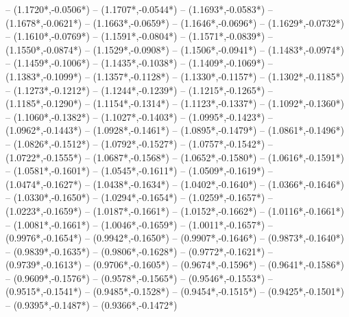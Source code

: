 {	-- ({1.1720*\dx},{-0.0506*\dy})
	-- ({1.1707*\dx},{-0.0544*\dy})
	-- ({1.1693*\dx},{-0.0583*\dy})
	-- ({1.1678*\dx},{-0.0621*\dy})
	-- ({1.1663*\dx},{-0.0659*\dy})
	-- ({1.1646*\dx},{-0.0696*\dy})
	-- ({1.1629*\dx},{-0.0732*\dy})
	-- ({1.1610*\dx},{-0.0769*\dy})
	-- ({1.1591*\dx},{-0.0804*\dy})
	-- ({1.1571*\dx},{-0.0839*\dy})
	-- ({1.1550*\dx},{-0.0874*\dy})
	-- ({1.1529*\dx},{-0.0908*\dy})
	-- ({1.1506*\dx},{-0.0941*\dy})
	-- ({1.1483*\dx},{-0.0974*\dy})
	-- ({1.1459*\dx},{-0.1006*\dy})
	-- ({1.1435*\dx},{-0.1038*\dy})
	-- ({1.1409*\dx},{-0.1069*\dy})
	-- ({1.1383*\dx},{-0.1099*\dy})
	-- ({1.1357*\dx},{-0.1128*\dy})
	-- ({1.1330*\dx},{-0.1157*\dy})
	-- ({1.1302*\dx},{-0.1185*\dy})
	-- ({1.1273*\dx},{-0.1212*\dy})
	-- ({1.1244*\dx},{-0.1239*\dy})
	-- ({1.1215*\dx},{-0.1265*\dy})
	-- ({1.1185*\dx},{-0.1290*\dy})
	-- ({1.1154*\dx},{-0.1314*\dy})
	-- ({1.1123*\dx},{-0.1337*\dy})
	-- ({1.1092*\dx},{-0.1360*\dy})
	-- ({1.1060*\dx},{-0.1382*\dy})
	-- ({1.1027*\dx},{-0.1403*\dy})
	-- ({1.0995*\dx},{-0.1423*\dy})
	-- ({1.0962*\dx},{-0.1443*\dy})
	-- ({1.0928*\dx},{-0.1461*\dy})
	-- ({1.0895*\dx},{-0.1479*\dy})
	-- ({1.0861*\dx},{-0.1496*\dy})
	-- ({1.0826*\dx},{-0.1512*\dy})
	-- ({1.0792*\dx},{-0.1527*\dy})
	-- ({1.0757*\dx},{-0.1542*\dy})
	-- ({1.0722*\dx},{-0.1555*\dy})
	-- ({1.0687*\dx},{-0.1568*\dy})
	-- ({1.0652*\dx},{-0.1580*\dy})
	-- ({1.0616*\dx},{-0.1591*\dy})
	-- ({1.0581*\dx},{-0.1601*\dy})
	-- ({1.0545*\dx},{-0.1611*\dy})
	-- ({1.0509*\dx},{-0.1619*\dy})
	-- ({1.0474*\dx},{-0.1627*\dy})
	-- ({1.0438*\dx},{-0.1634*\dy})
	-- ({1.0402*\dx},{-0.1640*\dy})
	-- ({1.0366*\dx},{-0.1646*\dy})
	-- ({1.0330*\dx},{-0.1650*\dy})
	-- ({1.0294*\dx},{-0.1654*\dy})
	-- ({1.0259*\dx},{-0.1657*\dy})
	-- ({1.0223*\dx},{-0.1659*\dy})
	-- ({1.0187*\dx},{-0.1661*\dy})
	-- ({1.0152*\dx},{-0.1662*\dy})
	-- ({1.0116*\dx},{-0.1661*\dy})
	-- ({1.0081*\dx},{-0.1661*\dy})
	-- ({1.0046*\dx},{-0.1659*\dy})
	-- ({1.0011*\dx},{-0.1657*\dy})
	-- ({0.9976*\dx},{-0.1654*\dy})
	-- ({0.9942*\dx},{-0.1650*\dy})
	-- ({0.9907*\dx},{-0.1646*\dy})
	-- ({0.9873*\dx},{-0.1640*\dy})
	-- ({0.9839*\dx},{-0.1635*\dy})
	-- ({0.9806*\dx},{-0.1628*\dy})
	-- ({0.9772*\dx},{-0.1621*\dy})
	-- ({0.9739*\dx},{-0.1613*\dy})
	-- ({0.9706*\dx},{-0.1605*\dy})
	-- ({0.9674*\dx},{-0.1596*\dy})
	-- ({0.9641*\dx},{-0.1586*\dy})
	-- ({0.9609*\dx},{-0.1576*\dy})
	-- ({0.9578*\dx},{-0.1565*\dy})
	-- ({0.9546*\dx},{-0.1553*\dy})
	-- ({0.9515*\dx},{-0.1541*\dy})
	-- ({0.9485*\dx},{-0.1528*\dy})
	-- ({0.9454*\dx},{-0.1515*\dy})
	-- ({0.9425*\dx},{-0.1501*\dy})
	-- ({0.9395*\dx},{-0.1487*\dy})
	-- ({0.9366*\dx},{-0.1472*\dy})
}
